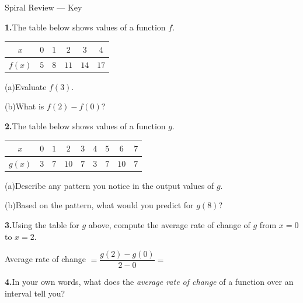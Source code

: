 \documentclass[10pt]{article}
\begin{document}
\namedateperiod

\vspace{0.12in}

\begin{notesbox}{Spiral Review --- Key}

\textbf{1.}\quad The table below shows values of a function $f$.

\vspace{4pt}
\begin{center}
\renewcommand{\arraystretch}{1.4}
\begin{tabular}{|c|c|c|c|c|c|}
\hline
$x$ & $0$ & $1$ & $2$ & $3$ & $4$ \\
\hline
$f(x)$ & $5$ & $8$ & $11$ & $14$ & $17$ \\
\hline
\end{tabular}
\end{center}

\vspace{4pt}
(a)\quad Evaluate $f(3)$. 

\vspace{4pt}
(b)\quad What is $f(2) - f(0)$? 

\vspace{0.14in}
\textbf{2.}\quad The table below shows values of a function $g$.

\vspace{4pt}
\begin{center}
\renewcommand{\arraystretch}{1.4}
\begin{tabular}{|c|c|c|c|c|c|c|c|c|}
\hline
$x$ & $0$ & $1$ & $2$ & $3$ & $4$ & $5$ & $6$ & $7$ \\
\hline
$g(x)$ & $3$ & $7$ & $10$ & $7$ & $3$ & $7$ & $10$ & $7$ \\
\hline
\end{tabular}
\end{center}

\vspace{4pt}
(a)\quad Describe any pattern you notice in the output values of $g$.

\vspace{4pt}
(b)\quad Based on the pattern, what would you predict for $g(8)$?

\vspace{0.14in}
\textbf{3.}\quad Using the table for $g$ above, compute the average rate of
change of $g$ from $x = 0$ to $x = 2$.

\vspace{4pt}
Average rate of change $= \dfrac{g(2) - g(0)}{2 - 0} = $ 

\vspace{0.14in}
\textbf{4.}\quad In your own words, what does the \emph{average rate of change}
of a function over an interval tell you?

\end{notesbox}
\end{document}
